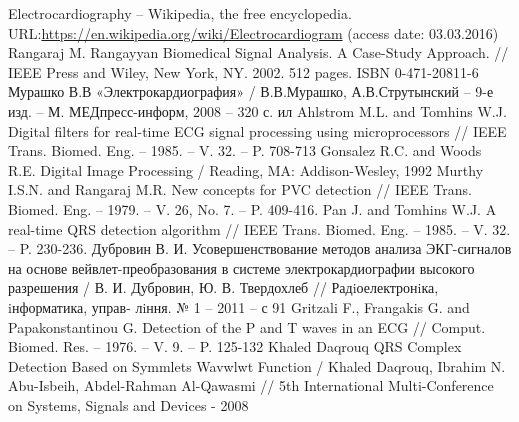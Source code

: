 \documentclass[runningheads]{AIIT}
\begin{document}
%
%
 \begin{thebibliography}{99}
  Electrocardiography -- Wikipedia, the free encyclopedia. URL:\url{https://en.wikipedia.org/wiki/Electrocardiogram} (access date: 03.03.2016)
  Rangaraj M. Rangayyan Biomedical Signal Analysis. A Case-Study Approach. // IEEE Press and Wiley, New York, NY. 2002. 512 pages. ISBN 0-471-20811-6 
  Мурашко В.В «Электрокардиография» / В.В.Мурашко, А.В.Струтынский – 9-е изд. – М. МЕДпресс-информ, 2008 – 320 с. ил 
  Ahlstrom M.L. and Tomhins W.J. Digital filters for real-time ECG signal processing using microprocessors // IEEE Trans. Biomed. Eng. – 1985. – V. 32. – P. 708-713
  Gonsalez R.C. and Woods R.E. Digital Image Processing / Reading, MA: Addison-Wesley, 1992
  Murthy I.S.N. and Rangaraj M.R. New concepts for PVC detection // IEEE Trans. Biomed. Eng. – 1979. – V. 26, No. 7. – P. 409-416.
  Pan J. and Tomhins W.J. A real-time QRS detection algorithm // IEEE Trans. Biomed. Eng. – 1985. – V. 32. – P. 230-236.
  Дубровин В. И. Усовершенствование методов анализа ЭКГ-сигналов на основе вейвлет-преобразования в системе электрокардиографии высокого разрешения / В. И. Дубровин, Ю. В. Твердохлеб // Радiоелектронiка, iнформатика, управ- лiння. № 1 – 2011 – с 91
  Gritzali F., Frangakis G. and Papakonstantinou G. Detection of the P and T waves in an ECG // Comput. Biomed. Res. – 1976. – V. 9. – P. 125-132
  Khaled Daqrouq QRS Complex Detection Based on Symmlets Wavwlwt Function / Khaled Daqrouq, Ibrahim N. Abu-Isbeih, Abdel-Rahman Al-Qawasmi // 5th International Multi-Conference on Systems, Signals and Devices - 2008
 \end{thebibliography}


%
%

\end{document}
